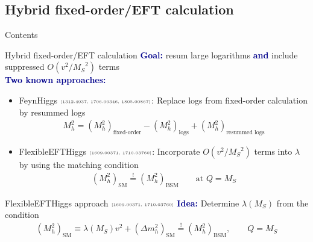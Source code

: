 \documentclass[hyperref={pdfpagelabels=false},ngerman]{beamer}
\newcommand{\MS}{\ensuremath{M_S}}
\newcommand{\mycite}[1]{\ensuremath{\text{\textcolor{darkgray}{\tiny [#1]}}}}
\renewcommand{\emph}[1]{\textbf{\textcolor{darkblue}{#1}}}
\newcommand{\SM}{\ensuremath{\text{SM}}}
\newcommand{\BSM}{\ensuremath{\text{BSM}}}
\begin{document}

\subsection{Hybrid fixed-order/EFT calculation}

\begin{frame}{Contents}
\end{frame}

\begin{frame}{Hybrid fixed-order/EFT calculation}
  \emph{Goal:} resum large logarithms \emph{and} include suppressed
  $O(v^2/\MS^2)$ terms
  \\[2em]
  \emph{Two known approaches:}
  \begin{itemize}
  \item FeynHiggs \mycite{1312.4937, 1706.00346, 1805.00867}: Replace logs from
    fixed-order calculation by resummed logs
    \begin{align*}
      M_h^2 = (M_h^2)_{\text{fixed-order}} - (M_h^2)_{\text{logs}} + (M_h^2)_{\text{resummed logs}}
    \end{align*}
  \item FlexibleEFTHiggs \mycite{1609.00371, 1710.03760}: Incorporate
    $O(v^2/\MS^2)$ terms into $\lambda$ by using the matching
    condition
    \begin{align*}
      (M_h^2)_{\SM} \overset{!}{=} (M_h^2)_{\BSM} \qquad \text{at } Q = \MS
    \end{align*}
  \end{itemize}
\end{frame}

\begin{frame}{FlexibleEFTHiggs approach \mycite{1609.00371, 1710.03760}}
  \emph{Idea:}
  Determine $\lambda(\MS)$ from the condition
  \begin{align*}
    (M_h^2)_{\SM} \equiv \lambda(\MS) v^2 + (\Delta m_h^2)_{\SM} \overset{!}{=} (M_h^2)_{\BSM} , \qquad Q = \MS
  \end{align*}
  \begin{center}
  \end{center}
\end{frame}
\end{document}

